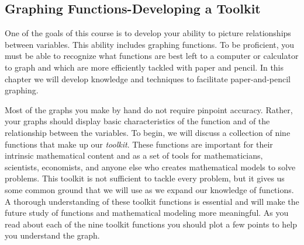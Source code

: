 \documentclass[10pt,]{book}
\theoremstyle{ptxdefinitionnotitle}
\theoremstyle{ptxdefinitiontitle}
\numberwithin{equation}{section}
\begin{document}
\subsection[{Graphing Functions-Developing a Toolkit}]{Graphing Functions-Developing a Toolkit}\label{subsection-1}
\hypertarget{p-40}{}%
One of the goals of this course is to develop your ability to picture relationships between variables.  This ability includes graphing functions.  To be proficient, you must be able to recognize what functions are best left to a computer or calculator to graph and which are more efficiently tackled with paper and pencil.  In this chapter we will develop knowledge and techniques to facilitate paper-and-pencil graphing.%
\par
\hypertarget{p-41}{}%
Most of the graphs you make by hand do not require pinpoint accuracy.  Rather, your graphs should display basic characteristics of the function and of the relationship between the variables.  To begin, we will discuss a collection of nine functions that make up our \emph{toolkit}. These functions are important for their intrinsic mathematical content and as a set of tools for mathematicians, scientists, economists, and anyone else who creates mathematical models to solve problems.  This toolkit is not sufficient to tackle every problem, but it gives us some common ground that we will use as we expand our knowledge of functions.  A thorough understanding of these toolkit functions is essential and will make the future study of functions and mathematical modeling more meaningful. As you read about each of the nine toolkit functions you should plot a few points to help you understand the graph.%
\typeout{************************************************}
\typeout{************************************************}
\end{document}
